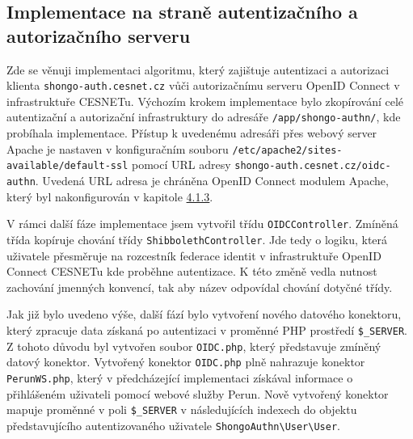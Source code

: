 \documentclass[
  printed, %
  twoside, %
  table,   %
  nolof,     %
  nolot,     %
]{fithesis3}
\begin{document}
\subsection{Implementace na straně autentizačního a autorizačního serveru}
\label{ShongoImpl-authn}
Zde se věnuji implementaci algoritmu, který zajištuje autentizaci a autorizaci klienta \texttt{shongo-auth.cesnet.cz} vůči autorizačnímu serveru OpenID Connect v infrastruktuře CESNETu. Výchozím krokem implementace bylo zkopírování celé autentizační a autorizační infrastruktury do adresáře \texttt{/app/shongo-authn/}, kde probíhala implementace. Přístup k uvedenému adresáři přes webový server Apache je nastaven v konfiguračním souboru \texttt{/etc/apache2/sites-available/default-ssl} pomocí URL adresy \texttt{shongo-auth.cesnet.cz/oidc-authn}. Uvedená URL adresa je chráněna OpenID Connect modulem Apache, který byl nakonfigurován v kapitole \hyperref[shongo-location]{4.1.3}.  \par

V rámci další fáze implementace jsem vytvořil třídu \texttt{OIDCController}. Zmíněná třída kopíruje chování třídy \texttt{ShibbolethController}. Jde tedy o logiku, která uživatele přesměruje na rozcestník federace identit v infrastruktuře OpenID Connect CESNETu kde proběhne autentizace. K této změně vedla nutnost zachování jmenných konvencí, tak aby název odpovídal chování dotyčné třídy. \par 

Jak již bylo uvedeno výše, další fází bylo vytvoření nového datového konektoru, který zpracuje data získaná po autentizaci v proměnné PHP prostředí \texttt{\$\_SERVER}. Z tohoto důvodu byl vytvořen soubor \texttt{OIDC.php}, který představuje zmíněný datový konektor. Vytvořený konektor \texttt{OIDC.php} plně nahrazuje konektor \texttt{PerunWS.php}, který v předcházející implementaci získával informace o přihlášeném uživateli pomocí webové služby Perun. Nově vytvořený konektor mapuje proměnné v poli \texttt{\$\_SERVER} v následujících indexech do objektu představujícího autentizovaného uživatele \texttt{ShongoAuthn\textbackslash User\textbackslash User}. 
\end{document}
